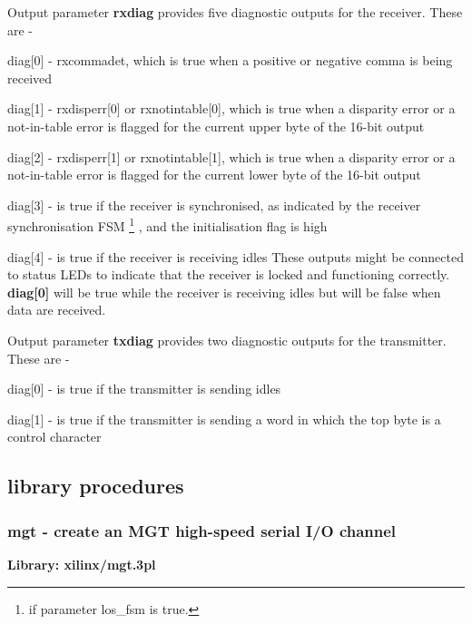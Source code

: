             Output parameter {\bf rxdiag} provides five diagnostic outputs for the
            receiver. These are -
            \blist
            \item   diag[0] - rxcommadet, which is true when a positive or
                    negative comma is being received
            \item   diag[1] - rxdisperr[0] or rxnotintable[0], which is true
                    when a disparity error or a not-in-table error is
                    flagged for the current upper byte of the 16-bit output
            \item   diag[2] - rxdisperr[1] or rxnotintable[1], which is true
                    when a disparity error or a not-in-table error is
                    flagged for the current lower byte of the 16-bit output
            \item   diag[3] - is true if the receiver is synchronised, as
                    indicated by the receiver synchronisation FSM \footnote{if
                    parameter los\_fsm is true.} , and the
                    initialisation flag is high
            \item   diag[4] - is true if the receiver is receiving idles
            \blend
            These outputs might be connected to status LEDs to indicate that the
            receiver is locked and functioning correctly. {\bf diag[0]} will be true
            while the receiver is receiving idles but will be false when data are
            received.

            Output parameter {\bf txdiag} provides two diagnostic outputs for the
            transmitter. These are -
            \blist
            \item   diag[0] - is true if the transmitter is sending idles
            \item   diag[1] - is true if the transmitter is sending a word in which
                    the top byte is a control character
            \blend


    \subsection{library procedures}

        \subsubsection{mgt - create an MGT high-speed serial I/O channel}\label{sec:lpmgt}

            {\bf Library: xilinx/mgt.3pl}

